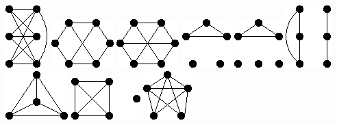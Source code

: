 \documentclass[11pt,paper=b5,footinclude,headinclude]{scrbook} %
\begin{document}
\includegraphics[scale=0.5,frame]{smallGraphs/g_K33+e.png}     
\includegraphics[scale=0.5,frame]{smallGraphs/g_K33-e.png}     
\includegraphics[scale=0.5,frame]{smallGraphs/g_K33.png}     
\includegraphics[scale=0.5,frame]{smallGraphs/g_K3U2K1.png}     
\includegraphics[scale=0.5,frame]{smallGraphs/g_K3U3K1.png}     
\includegraphics[scale=0.5,frame]{smallGraphs/g_K3UP3.png}     
\includegraphics[scale=0.5,frame]{smallGraphs/g_K4.png}     
\includegraphics[scale=0.5,frame]{smallGraphs/g_K4UK1.png}     
\includegraphics[scale=0.5,frame]{smallGraphs/g_K5-e.png}     
\end{document}
